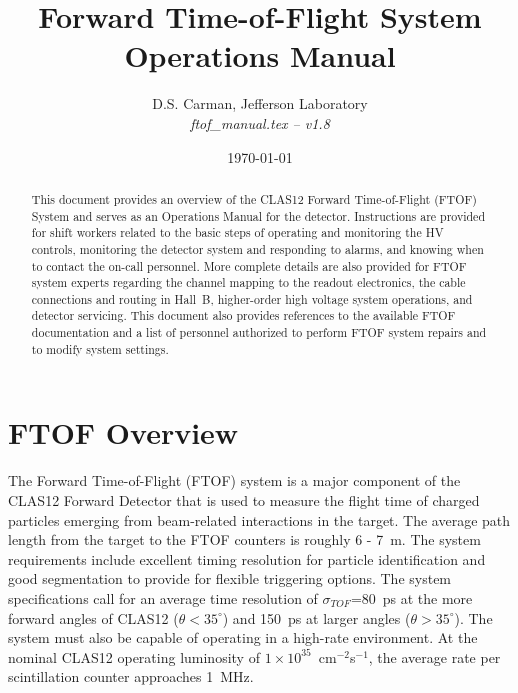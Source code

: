 \documentclass[12pt]{article}
\begin{document}
\title{Forward Time-of-Flight System Operations Manual}

\vskip 0.5cm

\author{D.S. Carman, Jefferson Laboratory\\[0.2ex]
{\it ftof\_manual.tex -- v1.8}}

\date \today
%
\maketitle

\begin{abstract}
This document provides an overview of the CLAS12 Forward Time-of-Flight (FTOF) System 
and serves as an Operations Manual for the detector. Instructions are provided for 
shift workers related to the basic steps of operating and monitoring the HV controls, 
monitoring the detector system and responding to alarms, and knowing when to contact 
the on-call personnel. More complete details are also provided for FTOF system experts 
regarding the channel mapping to the readout electronics, the cable connections and 
routing in Hall~B, higher-order high voltage system operations, and detector servicing. 
This document also provides references to the available FTOF documentation and a list 
of personnel authorized to perform FTOF system repairs and to modify system settings.
\end{abstract}

\thispagestyle{empty}

\clearpage

\vfil
\eject

\tableofcontents

\vfil
\eject

\section{FTOF Overview}
\label{intro}

The Forward Time-of-Flight (FTOF) system is a major component of the CLAS12 Forward 
Detector that is used to measure the flight time of charged particles emerging from 
beam-related interactions in the target. The average path length from the target to 
the FTOF counters is roughly 6 - 7~m. The system requirements include excellent timing 
resolution for particle identification and good segmentation to provide for flexible 
triggering options. The system specifications call for an average time resolution of 
$\sigma_{TOF}$=80~ps at the more forward angles of CLAS12 ($\theta < 35^\circ$) and 
150~ps at larger angles ($\theta > 35^\circ$). The system must also be capable of 
operating in a high-rate environment. At the nominal CLAS12 operating luminosity of 
$1 \times 10^{35}$~cm$^{-2}$s$^{-1}$, the average rate per scintillation counter approaches
1~MHz.
\end{document}
